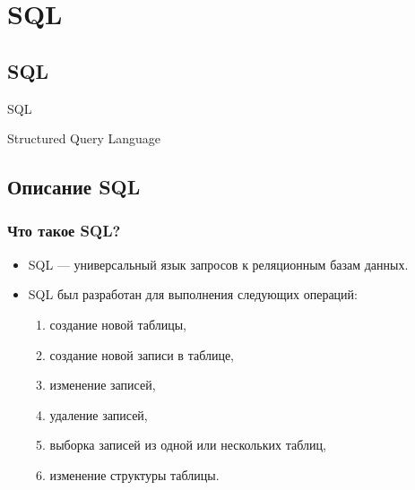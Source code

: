 \documentclass[compress,red]{beamer}
\begin{document}
\section{SQL}
\subsection{SQL}
\begin{frame}
  \begin{center}
    \Huge{SQL}
  \end{center}
  \begin{center}
    \Large{Structured Query Language}
  \end{center}
\end{frame}

\subsection{Описание SQL}
\begin{frame}[fragile]
  \frametitle{Что такое SQL?}
  \begin{itemize}
    \item SQL --- универсальный язык запросов к реляционным базам данных.
    \item SQL был разработан для выполнения следующих операций:
      \begin{enumerate}
        \item создание новой таблицы,
        \item создание новой записи в таблице,
        \item изменение записей,
        \item удаление записей,
        \item выборка записей из одной или нескольких таблиц,
        \item изменение структуры таблицы.
      \end{enumerate}
  \end{itemize}
\end{frame}
\end{document}
